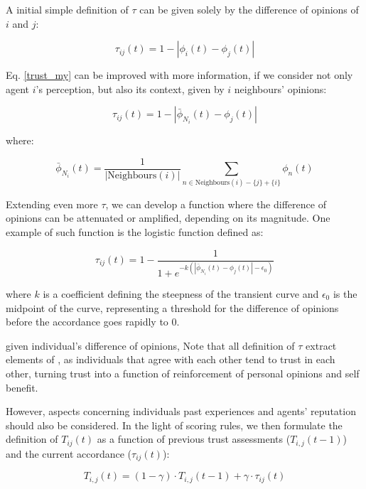 \documentclass[conference,compsoc]{IEEEtran}
\begin{document}
A initial simple definition of $\tau$ can be given solely by the difference of opinions of $i$ and $j$:

\begin{equation}
  \tau_{ij}(t) = 1 - | \phi_i(t) - \phi_j(t) |
\label{trust_my}
\end{equation}

Eq. \ref{trust_my} can be improved with more information, if we consider not only agent $i$'s perception, but also its context, given by $i$ neighbours' opinions:

\begin{equation}
  \tau_{ij}(t) = 1 - |\bar\phi_{N_i}(t) - \phi_j(t) |
\end{equation}

where:

$$\bar\phi_{N_i}(t) = \frac{1}{|\text{Neighbours}(i)|} \sum_{n \in \text{Neighbours}(i)-\{j\}+\{i\}} \phi_n(t)$$


Extending even more $\tau$, we can develop a function where the difference of opinions can be attenuated or amplified, depending on its magnitude. One example of such function is the logistic function defined as:

\begin{equation}
  \tau_{ij}(t) = 1 - \frac{1}{1 + e^{-k(|\bar\phi_{N_i}(t) - \phi_j(t) | - \epsilon_0)}}
\label{logistic}
\end{equation}

where $k$ is a coefficient defining the steepness of the transient curve and $\epsilon_0$ is the midpoint of the curve, representing a threshold for the difference of opinions before the accordance goes rapidly to 0.


given individual's difference of opinions,
Note that all definition of $\tau$ extract elements of \cite{Neville}, as individuals that agree with each other tend to trust in each other, turning trust into a function of reinforcement of personal opinions and self benefit.

However, aspects concerning individuals past experiences and agents' reputation should also be considered. In the light of \cite{PittDagostino} scoring rules, we then formulate the definition of $T_{ij}(t)$ as a function of previous trust assessments ($T_{i,j}(t-1)$) and the current accordance ($\tau_{ij}(t)$):

\begin{equation}
    T_{i,j}(t) = (1 - \gamma) \cdot T_{i,j} \left ( t-1 \right ) +  \gamma \cdot \tau_{ij}(t)
    \label{trust}
\end{equation}
\end{document}
